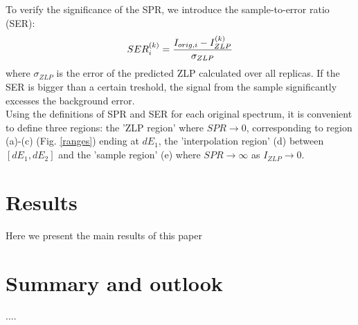 \documentclass[11pt,a4paper]{article}
\def\frac#1#2{{{#1}\over {#2}}}
\numberwithin{equation}{section}
\numberwithin{figure}{section}
\numberwithin{table}{section}
\begin{document}
To verify the significance of the SPR, we introduce the sample-to-error ratio (SER):
\begin{equation}
    SER_{i}^{(k)} = \frac{I_{orig, i} - I_{ZLP}^{(k)}}{\sigma_{ZLP}}
\end{equation}
where $\sigma_{ZLP}$ is the error of the predicted ZLP calculated over all replicas. 
If the SER is bigger than a certain treshold, the signal from the sample significantly excesses the background error. \\
Using the definitions of SPR and SER for each original spectrum, it is convenient to define three regions: the 'ZLP region' where $SPR \rightarrow0$, corresponding to region (a)-(c) (Fig. \ref{ranges}) ending at $dE_1$, the 'interpolation region' (d) between $[dE_1, dE_2]$ and the 'sample region' (e) where $SPR\rightarrow\infty$ as $I_{ZLP}\rightarrow0$.


\section{Results}
Here we present the main results of this paper

\section{Summary and outlook}
....


\end{document}
